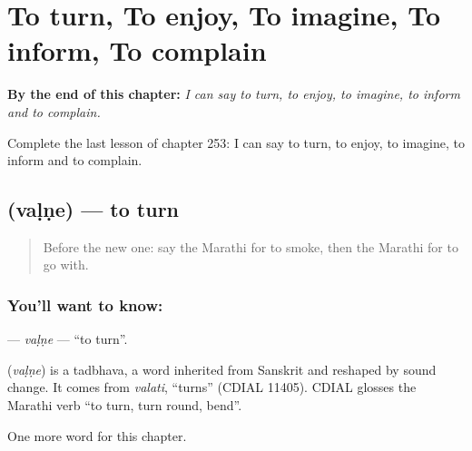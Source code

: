 
\chapter{To turn, To enjoy, To imagine, To inform, To complain}
\label{ch:mr-to-turn-to-enjoy-to-imagine-to-inform-to-complain}

\begin{chapteropening}
\textbf{By the end of this chapter:} \emph{I can say to turn, to enjoy, to imagine, to inform and to complain.}

Complete the last lesson of chapter 253: I can say to turn, to enjoy, to imagine, to inform and to complain.
\end{chapteropening}

\section[\texorpdfstring{\mr{वळणे} (vaḷṇe)}{वळणे (vaḷṇe)}]{ (vaḷṇe) — to turn}

\label{lesson:MR-C253-valne}



\begin{quote}
Before the new one: say the Marathi for to smoke, then the Marathi for to go with.
\end{quote}

\subsection*{You'll want to know: }
\textbf{} — \emph{vaḷṇe} — \textquotedblleft{}to turn\textquotedblright{}.

\begin{cousinweb}
\textbf{} (\emph{vaḷṇe}) is a tadbhava, a word inherited from Sanskrit and reshaped by sound change. It comes from \emph{valati}, \textquotedblleft{}turns\textquotedblright{} (CDIAL 11405). CDIAL glosses the Marathi verb \textquotedblleft{}to turn, turn round, bend\textquotedblright{}.
\end{cousinweb}

\begin{grammarlens}[title={What you've built}]
One more word for this chapter.
\end{grammarlens}


